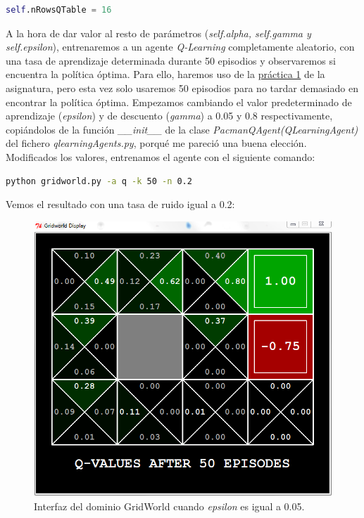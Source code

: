 \documentclass[11pt]{exam}
\begin{document}
\begin{lstlisting}[language=python, basicstyle=\footnotesize]
self.nRowsQTable = 16
\end{lstlisting}

A la hora de dar valor al resto de parámetros (\textit{self.alpha, self.gamma y self.epsilon}), entrenaremos a un agente \textit{Q-Learning} completamente aleatorio, con una tasa de aprendizaje determinada durante 50 episodios y observaremos si encuentra la política óptima. Para ello, haremos uso de la \href{https://poliformat.upv.es/portal/site/ESP_0_2835/tool/c07b745a-0cfd-44f0-a7a2-9bb22f80c3f7?panel=Main}{práctica 1} de la asignatura, pero esta vez solo usaremos 50 episodios para no tardar demasiado en encontrar la política óptima. Empezamos cambiando el valor predeterminado de aprendizaje (\textit{epsilon}) y de descuento (\textit{gamma}) a 0.05 y 0.8 respectivamente, copiándolos de la función \textit{\_\_init\_\_} de la clase \textit{PacmanQAgent(QLearningAgent)} del fichero \textit{qlearningAgents.py}, porqué me pareció una buena elección. Modificados los valores, entrenamos el agente con el siguiente comando:

\begin{lstlisting}[language=bash, basicstyle=\footnotesize]
python gridworld.py -a q -k 50 -n 0.2
\end{lstlisting}

Vemos el resultado con una tasa de ruido igual a 0.2:

\begin{figure}[H]
	\centering
	\includegraphics[scale=0.5]{figures/50_0.05}
	\caption{Interfaz del dominio GridWorld cuando \textit{epsilon} es igual a 0.05.}
	\label{fig:50_0.05}
\end{figure}
\end{document}
